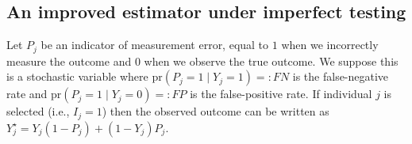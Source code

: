 \documentclass[11pt]{amsart}
\def\pr{\text{pr}}
\begin{document}


\subsection{An improved estimator under imperfect testing}


Let $P_j$ be an indicator of measurement error, equal to $1$ when we incorrectly measure the outcome and $0$ when we observe the true outcome. We suppose this is a stochastic variable where $\pr(P_j = 1 \mid Y_j = 1) =: FN$ is the false-negative rate and $\pr(P_j = 1 \mid Y_j = 0) =: FP$ is the false-positive rate.  If individual $j$ is selected (i.e., $I_j = 1$) then the observed outcome can be written as $Y_j^{\star} = Y_j(1-P_j) + (1-Y_j) P_j$.
\end{document}
